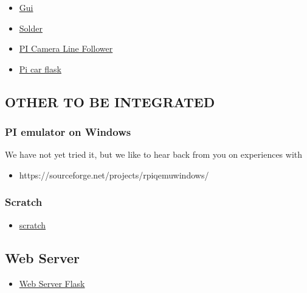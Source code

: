 \begin{itemize}
\tightlist
\item
  \href{https://www.raspberrypi.org/learning/getting-started-with-guis/worksheet/}{Gui}\\
\item
  \href{https://www.raspberrypi.org/learning/getting-started-with-guis/}{Solder}\\
\item
  \href{https://www.raspberrypi.org/blog/an-image-processing-robot-for-robocup-junior/}{PI
  Camera Line Follower}\\
\item
  \href{https://circuitdigest.com/microcontroller-projects/web-controlled-raspberry-pi-surveillance-robot}{Pi
  car flask}
\end{itemize}

\subsection{OTHER TO BE INTEGRATED}\label{other-to-be-integrated}

\subsubsection{PI emulator on Windows}\label{pi-emulator-on-windows}

We have not yet tried it, but we like to hear back from you on
experiences with

\begin{itemize}
\tightlist
\item
  https://sourceforge.net/projects/rpiqemuwindows/
\end{itemize}

\subsubsection{Scratch}\label{scratch}

\begin{itemize}
\tightlist
\item
  \href{https://github.com/DexterInd/GrovePi/tree/master/Software/Scratch}{scratch}
\end{itemize}

\subsection{Web Server}\label{web-server}

\begin{itemize}
\tightlist
\item
  \href{https://www.raspberrypi.org/learning/python-web-server-with-flask/worksheet/}{Web
  Server Flask}
\end{itemize}
